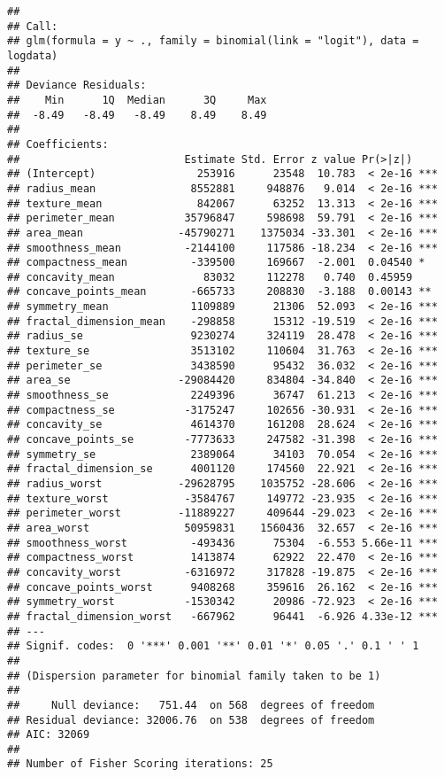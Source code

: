 \documentclass[
]{article}
\begin{document}
\begin{verbatim}
## 
## Call:
## glm(formula = y ~ ., family = binomial(link = "logit"), data = logdata)
## 
## Deviance Residuals: 
##    Min      1Q  Median      3Q     Max  
##  -8.49   -8.49   -8.49    8.49    8.49  
## 
## Coefficients:
##                          Estimate Std. Error z value Pr(>|z|)    
## (Intercept)                253916      23548  10.783  < 2e-16 ***
## radius_mean               8552881     948876   9.014  < 2e-16 ***
## texture_mean               842067      63252  13.313  < 2e-16 ***
## perimeter_mean           35796847     598698  59.791  < 2e-16 ***
## area_mean               -45790271    1375034 -33.301  < 2e-16 ***
## smoothness_mean          -2144100     117586 -18.234  < 2e-16 ***
## compactness_mean          -339500     169667  -2.001  0.04540 *  
## concavity_mean              83032     112278   0.740  0.45959    
## concave_points_mean       -665733     208830  -3.188  0.00143 ** 
## symmetry_mean             1109889      21306  52.093  < 2e-16 ***
## fractal_dimension_mean    -298858      15312 -19.519  < 2e-16 ***
## radius_se                 9230274     324119  28.478  < 2e-16 ***
## texture_se                3513102     110604  31.763  < 2e-16 ***
## perimeter_se              3438590      95432  36.032  < 2e-16 ***
## area_se                 -29084420     834804 -34.840  < 2e-16 ***
## smoothness_se             2249396      36747  61.213  < 2e-16 ***
## compactness_se           -3175247     102656 -30.931  < 2e-16 ***
## concavity_se              4614370     161208  28.624  < 2e-16 ***
## concave_points_se        -7773633     247582 -31.398  < 2e-16 ***
## symmetry_se               2389064      34103  70.054  < 2e-16 ***
## fractal_dimension_se      4001120     174560  22.921  < 2e-16 ***
## radius_worst            -29628795    1035752 -28.606  < 2e-16 ***
## texture_worst            -3584767     149772 -23.935  < 2e-16 ***
## perimeter_worst         -11889227     409644 -29.023  < 2e-16 ***
## area_worst               50959831    1560436  32.657  < 2e-16 ***
## smoothness_worst          -493436      75304  -6.553 5.66e-11 ***
## compactness_worst         1413874      62922  22.470  < 2e-16 ***
## concavity_worst          -6316972     317828 -19.875  < 2e-16 ***
## concave_points_worst      9408268     359616  26.162  < 2e-16 ***
## symmetry_worst           -1530342      20986 -72.923  < 2e-16 ***
## fractal_dimension_worst   -667962      96441  -6.926 4.33e-12 ***
## ---
## Signif. codes:  0 '***' 0.001 '**' 0.01 '*' 0.05 '.' 0.1 ' ' 1
## 
## (Dispersion parameter for binomial family taken to be 1)
## 
##     Null deviance:   751.44  on 568  degrees of freedom
## Residual deviance: 32006.76  on 538  degrees of freedom
## AIC: 32069
## 
## Number of Fisher Scoring iterations: 25
\end{verbatim}
\end{document}
